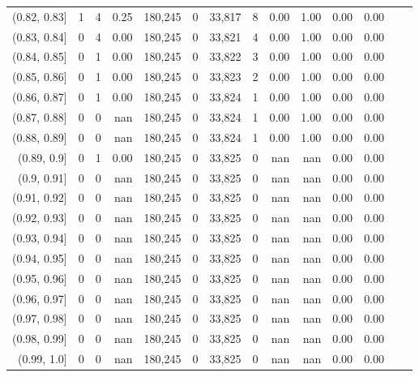 \begin{tabular}{rrrrrrrrrrrrrr}
(0.82, 0.83]   &      1 &    4 &    0.25 &  180,245 &        0 &  33,817 &       8 &  0.00 &  1.00 &  0.00 &      0.00 \\
(0.83, 0.84]   &      0 &    4 &    0.00 &  180,245 &        0 &  33,821 &       4 &  0.00 &  1.00 &  0.00 &      0.00 \\
(0.84, 0.85]   &      0 &    1 &    0.00 &  180,245 &        0 &  33,822 &       3 &  0.00 &  1.00 &  0.00 &      0.00 \\
(0.85, 0.86]   &      0 &    1 &    0.00 &  180,245 &        0 &  33,823 &       2 &  0.00 &  1.00 &  0.00 &      0.00 \\
(0.86, 0.87]   &      0 &    1 &    0.00 &  180,245 &        0 &  33,824 &       1 &  0.00 &  1.00 &  0.00 &      0.00 \\
(0.87, 0.88]   &      0 &    0 &     nan &  180,245 &        0 &  33,824 &       1 &  0.00 &  1.00 &  0.00 &      0.00 \\
(0.88, 0.89]   &      0 &    0 &     nan &  180,245 &        0 &  33,824 &       1 &  0.00 &  1.00 &  0.00 &      0.00 \\
(0.89, 0.9]    &      0 &    1 &    0.00 &  180,245 &        0 &  33,825 &       0 &   nan &   nan &  0.00 &      0.00 \\
(0.9, 0.91]    &      0 &    0 &     nan &  180,245 &        0 &  33,825 &       0 &   nan &   nan &  0.00 &      0.00 \\
(0.91, 0.92]   &      0 &    0 &     nan &  180,245 &        0 &  33,825 &       0 &   nan &   nan &  0.00 &      0.00 \\
(0.92, 0.93]   &      0 &    0 &     nan &  180,245 &        0 &  33,825 &       0 &   nan &   nan &  0.00 &      0.00 \\
(0.93, 0.94]   &      0 &    0 &     nan &  180,245 &        0 &  33,825 &       0 &   nan &   nan &  0.00 &      0.00 \\
(0.94, 0.95]   &      0 &    0 &     nan &  180,245 &        0 &  33,825 &       0 &   nan &   nan &  0.00 &      0.00 \\
(0.95, 0.96]   &      0 &    0 &     nan &  180,245 &        0 &  33,825 &       0 &   nan &   nan &  0.00 &      0.00 \\
(0.96, 0.97]   &      0 &    0 &     nan &  180,245 &        0 &  33,825 &       0 &   nan &   nan &  0.00 &      0.00 \\
(0.97, 0.98]   &      0 &    0 &     nan &  180,245 &        0 &  33,825 &       0 &   nan &   nan &  0.00 &      0.00 \\
(0.98, 0.99]   &      0 &    0 &     nan &  180,245 &        0 &  33,825 &       0 &   nan &   nan &  0.00 &      0.00 \\
(0.99, 1.0]    &      0 &    0 &     nan &  180,245 &        0 &  33,825 &       0 &   nan &   nan &  0.00 &      0.00 \\
\bottomrule
\end{tabular}
